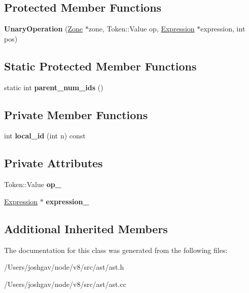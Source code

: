 \subsection*{Protected Member Functions}
\begin{DoxyCompactItemize}
\item 
{\bfseries Unary\+Operation} (\hyperlink{classv8_1_1internal_1_1_zone}{Zone} $\ast$zone, Token\+::\+Value op, \hyperlink{classv8_1_1internal_1_1_expression}{Expression} $\ast$expression, int pos)\hypertarget{classv8_1_1internal_1_1_unary_operation_acac1d1e5d00a3ea941c0646adafef5a8}{}\label{classv8_1_1internal_1_1_unary_operation_acac1d1e5d00a3ea941c0646adafef5a8}

\end{DoxyCompactItemize}
\subsection*{Static Protected Member Functions}
\begin{DoxyCompactItemize}
\item 
static int {\bfseries parent\+\_\+num\+\_\+ids} ()\hypertarget{classv8_1_1internal_1_1_unary_operation_a3321a2c40d5295d343ae50b67b96c9a5}{}\label{classv8_1_1internal_1_1_unary_operation_a3321a2c40d5295d343ae50b67b96c9a5}

\end{DoxyCompactItemize}
\subsection*{Private Member Functions}
\begin{DoxyCompactItemize}
\item 
int {\bfseries local\+\_\+id} (int n) const \hypertarget{classv8_1_1internal_1_1_unary_operation_affdce3c1086023b0c857b84af34c2653}{}\label{classv8_1_1internal_1_1_unary_operation_affdce3c1086023b0c857b84af34c2653}

\end{DoxyCompactItemize}
\subsection*{Private Attributes}
\begin{DoxyCompactItemize}
\item 
Token\+::\+Value {\bfseries op\+\_\+}\hypertarget{classv8_1_1internal_1_1_unary_operation_a7d498f812d2ce45782ed37b58fe2fe35}{}\label{classv8_1_1internal_1_1_unary_operation_a7d498f812d2ce45782ed37b58fe2fe35}

\item 
\hyperlink{classv8_1_1internal_1_1_expression}{Expression} $\ast$ {\bfseries expression\+\_\+}\hypertarget{classv8_1_1internal_1_1_unary_operation_a6b86b5410423ae0caebe246944b89b86}{}\label{classv8_1_1internal_1_1_unary_operation_a6b86b5410423ae0caebe246944b89b86}

\end{DoxyCompactItemize}
\subsection*{Additional Inherited Members}


The documentation for this class was generated from the following files\+:\begin{DoxyCompactItemize}
\item 
/\+Users/joshgav/node/v8/src/ast/ast.\+h\item 
/\+Users/joshgav/node/v8/src/ast/ast.\+cc\end{DoxyCompactItemize}
